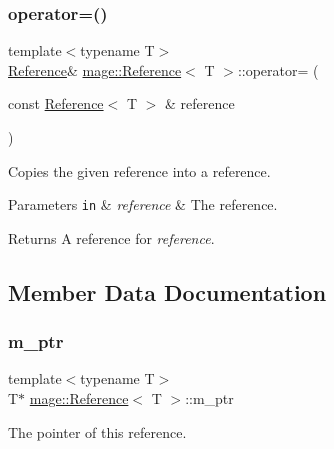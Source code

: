 \subsubsection{\texorpdfstring{operator=()}{operator=()}\hspace{0.1cm}{\footnotesize\ttfamily [2/2]}}
{\footnotesize\ttfamily template$<$typename T$>$ \\
\hyperlink{classmage_1_1_reference}{Reference}\& \hyperlink{classmage_1_1_reference}{mage\+::\+Reference}$<$ T $>$\+::operator= (\begin{DoxyParamCaption}\item[{const \hyperlink{classmage_1_1_reference}{Reference}$<$ T $>$ \&}]{reference }\end{DoxyParamCaption})}

Copies the given reference into a reference.


\begin{DoxyParams}[1]{Parameters}
\mbox{\tt in}  & {\em reference} & The reference. \\
\hline
\end{DoxyParams}
\begin{DoxyReturn}{Returns}
A reference for {\itshape reference}. 
\end{DoxyReturn}


\subsection{Member Data Documentation}
\hypertarget{classmage_1_1_reference_aa3d84127867c389254b7257cd3ed0733}{}\label{classmage_1_1_reference_aa3d84127867c389254b7257cd3ed0733} 
\subsubsection{\texorpdfstring{m\+\_\+ptr}{m\_ptr}}
{\footnotesize\ttfamily template$<$typename T$>$ \\
T$\ast$ \hyperlink{classmage_1_1_reference}{mage\+::\+Reference}$<$ T $>$\+::m\+\_\+ptr\hspace{0.3cm}{\ttfamily [private]}}

The pointer of this reference. 